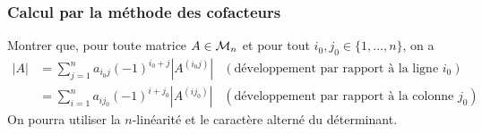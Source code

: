 \subsubsection{Calcul par la méthode des cofacteurs}

  Montrer que, pour toute matrice $A \in \mathcal{M}_n$ et pour tout $i_0, j_0 \in \{1, \dots, n\}$, on a 
  \begin{align*}
    |A| 
    & = \sum_{j=1}^n a_{i_0j} (-1)^{i_0+j} |A^{(i_0j)}| & (\text{développement par rapport à la ligne $i_0$}) \\
    & = \sum_{i=1}^n a_{ij_0} (-1)^{i+j_0} |A^{(ij_0)}| & (\text{développement par rapport à la colonne $j_0$})
  \end{align*}
  On pourra utiliser la $n$-linéarité et le caractère alterné du déterminant.

